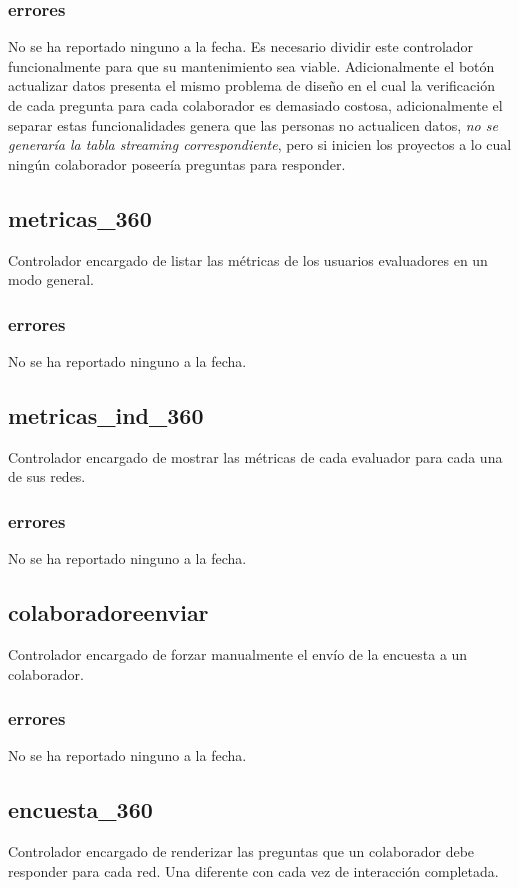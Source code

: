 \documentclass[10pt,a4paper]{book}
\begin{document}
	\subsubsection{errores}
	No se ha reportado ninguno a la fecha. Es necesario dividir este controlador funcionalmente para que su mantenimiento sea viable. Adicionalmente el botón actualizar datos presenta el mismo problema de diseño en el cual la verificación de cada pregunta para cada colaborador es demasiado costosa, adicionalmente el separar estas funcionalidades genera que las personas no actualicen datos, \textit{no se generaría la tabla streaming correspondiente}, pero si inicien los proyectos a lo cual ningún colaborador poseería preguntas para responder.
	
	\subsection{metricas\_360}
	Controlador encargado de listar las métricas de los usuarios evaluadores en un modo general.
	\subsubsection{errores}
	No se ha reportado ninguno a la fecha.
	
	\subsection{metricas\_ind\_360}
	Controlador encargado de mostrar las métricas de cada evaluador para cada una de sus redes.
	\subsubsection{errores}
	No se ha reportado ninguno a la fecha.
	
	\subsection{colaboradoreenviar}
	Controlador encargado de forzar manualmente el envío de la encuesta a un colaborador.
	\subsubsection{errores}
	No se ha reportado ninguno a la fecha.
	
	\subsection{encuesta\_360}
	Controlador encargado de renderizar las preguntas que un colaborador debe responder para cada red. Una diferente con cada vez de interacción completada.
\end{document}
